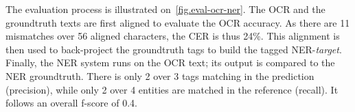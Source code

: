 The evaluation process is illustrated on~\cref{fig.eval-ocr-ner}. The OCR and the groundtruth texts are first aligned to
evaluate the OCR accuracy. As there are 11 mismatches over 56 aligned characters, the CER is thus 24\%. This alignment
is then used to back-project the groundtruth tags to build the tagged NER-\emph{target}. Finally, the NER system runs on the
OCR text; its output is compared to the NER groundtruth. There is only 2 over 3 tags matching in the prediction (precision),
while only 2 over 4 entities are matched in the reference (recall). It follows an overall f-score of 0.4.
%
